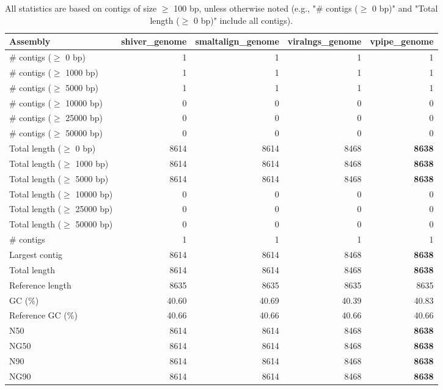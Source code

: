 \documentclass[12pt,a4paper]{article}
\begin{document}
\begin{table}[ht]
\begin{center}
\caption{All statistics are based on contigs of size $\geq$ 100 bp, unless otherwise noted (e.g., "\# contigs ($\geq$ 0 bp)" and "Total length ($\geq$ 0 bp)" include all contigs).}
\begin{tabular}{|l*{4}{|r}|}
\hline
Assembly & shiver\_genome & smaltalign\_genome & viralngs\_genome & vpipe\_genome \\ \hline
\# contigs ($\geq$ 0 bp) & 1 & 1 & 1 & 1 \\ \hline
\# contigs ($\geq$ 1000 bp) & 1 & 1 & 1 & 1 \\ \hline
\# contigs ($\geq$ 5000 bp) & 1 & 1 & 1 & 1 \\ \hline
\# contigs ($\geq$ 10000 bp) & 0 & 0 & 0 & 0 \\ \hline
\# contigs ($\geq$ 25000 bp) & 0 & 0 & 0 & 0 \\ \hline
\# contigs ($\geq$ 50000 bp) & 0 & 0 & 0 & 0 \\ \hline
Total length ($\geq$ 0 bp) & 8614 & 8614 & 8468 & {\bf 8638} \\ \hline
Total length ($\geq$ 1000 bp) & 8614 & 8614 & 8468 & {\bf 8638} \\ \hline
Total length ($\geq$ 5000 bp) & 8614 & 8614 & 8468 & {\bf 8638} \\ \hline
Total length ($\geq$ 10000 bp) & 0 & 0 & 0 & 0 \\ \hline
Total length ($\geq$ 25000 bp) & 0 & 0 & 0 & 0 \\ \hline
Total length ($\geq$ 50000 bp) & 0 & 0 & 0 & 0 \\ \hline
\# contigs & 1 & 1 & 1 & 1 \\ \hline
Largest contig & 8614 & 8614 & 8468 & {\bf 8638} \\ \hline
Total length & 8614 & 8614 & 8468 & {\bf 8638} \\ \hline
Reference length & 8635 & 8635 & 8635 & 8635 \\ \hline
GC (\%) & 40.60 & 40.69 & 40.39 & 40.83 \\ \hline
Reference GC (\%) & 40.66 & 40.66 & 40.66 & 40.66 \\ \hline
N50 & 8614 & 8614 & 8468 & {\bf 8638} \\ \hline
NG50 & 8614 & 8614 & 8468 & {\bf 8638} \\ \hline
N90 & 8614 & 8614 & 8468 & {\bf 8638} \\ \hline
NG90 & 8614 & 8614 & 8468 & {\bf 8638} \\ \hline

\end{tabular}
\end{center}
\end{table}
\end{document}
